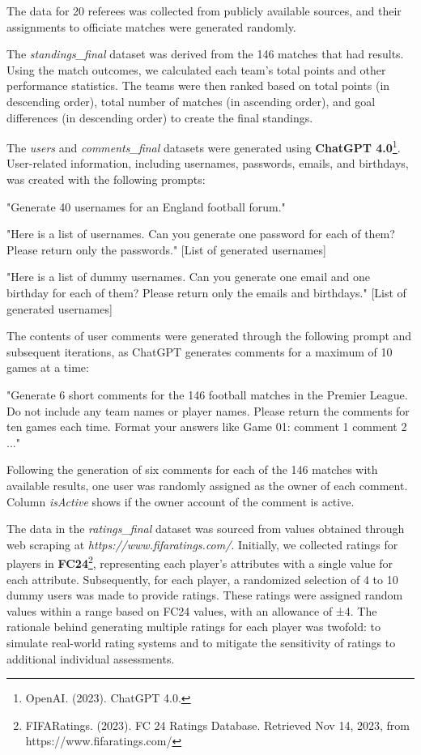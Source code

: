 \documentclass[letterpaper]{article}
\begin{document}
The data for 20 referees was collected from publicly available sources, and their assignments to officiate matches were generated randomly. 

The \textit{standings\_final} dataset was derived from the 146 matches that had results. Using the match outcomes, we calculated each team's total points and other performance statistics. The teams were then ranked based on total points (in descending order), total number of matches (in ascending order), and goal differences (in descending order) to create the final standings. 

The \textit{users} and \textit{comments\_final} datasets were generated using \textbf{ChatGPT 4.0}\footnote{OpenAI. (2023). ChatGPT 4.0.}. User-related information, including usernames, passwords, emails, and birthdays, was created with the following prompts: 

"Generate 40 usernames for an England football forum." 

"Here is a list of usernames. Can you generate one password for each of them? Please return only the passwords." [List of generated usernames] 

"Here is a list of dummy usernames. Can you generate one email and one birthday for each of them? Please return only the emails and birthdays." [List of generated usernames] 

The contents of user comments were generated through the following prompt and subsequent iterations, as ChatGPT generates comments for a maximum of 10 games at a time: 

"Generate 6 short comments for the 146 football matches in the Premier League. Do not include any team names or player names. Please return the comments for ten games each time. Format your answers like Game 01: comment 1 comment 2 ..." 

Following the generation of six comments for each of the 146 matches with available results, one user was randomly assigned as the owner of each comment. Column \textit{isActive} shows if the owner account of the comment is active. 

The data in the \textit{ratings\_final} dataset was sourced from values obtained through web scraping at \textit{https://www.fifaratings.com/}. Initially, we collected ratings for players in \textbf{FC24}\footnote{FIFARatings. (2023). FC 24 Ratings Database. Retrieved Nov 14, 2023, from https://www.fifaratings.com/}, representing each player's attributes with a single value for each attribute. Subsequently, for each player, a randomized selection of 4 to 10 dummy users was made to provide ratings. These ratings were assigned random values within a range based on FC24 values, with an allowance of ±4. The rationale behind generating multiple ratings for each player was twofold: to simulate real-world rating systems and to mitigate the sensitivity of ratings to additional individual assessments. 
\end{document}
